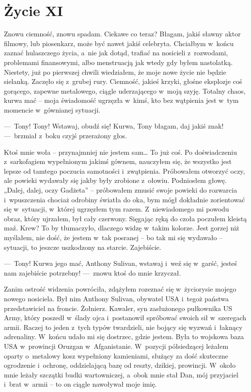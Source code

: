 \chapter{Życie XI}

Znowu ciemność, znowu spadam. Ciekawe co teraz? Błagam, jakiś sławny aktor filmowy, lub piosenkarz, może być nawet jakiś celebryta. Chciałbym w~końcu zaznać hulaszczego życia, a~nie jak dotąd, trafiać na nosicieli z~rozwodami, problemami finansowymi, albo menstruacją jak wtedy gdy byłem nastolatką. Niestety, już po pierwszej chwili wiedziałem, że moje nowe życie nie będzie sielanką. Zaczęło się z~grubej rury. Ciemność, jakieś krzyki, głośne eksplozje coś gorącego,  zapewne metalowego, ciągle uderzającego w~moją szyję. Totalny chaos, kurwa mać -- moja świadomość ugrzęzła w~kimś, kto bez wątpienia jest w~tym momencie w~gównianej sytuacji.  

---~Tony! Tony! Wstawaj, obudź się! Kurwa, Tony błagam, daj jakiś znak! ---~brzmiał z~boku czyjś przerażony głos. 

Ktoś mnie woła -- przynajmniej nie jestem sam… To już coś. Po doświadczeniu z~sarkofagiem wypełnionym jakimś gównem, nauczyłem się, że wszystko jest lepsze od tamtego poczucia samotności i~zwątpienia. Próbowałem otworzyć oczy, ale powieki wydawały się jakby były zrobione z~ołowiu. Podniosłem głowę. „Dalej, dalej, oczy Gadżeta” -- próbowałem zmusić swoje powieki do rozwarcia i~wpuszczenia chociaż odrobiny światła do oka, bym mógł dokładnie zorientować się w~sytuacji, w~której ugrzęzłem tym razem. Z~niewiadomego mi powodu obraz, który ujrzałem, był cały czerwony. Sięgając ręką do czoła poczułem kleistą maź. Krew? To by tłumaczyło, dlaczego widzę w~takim kolorze. Jest gorzej niż myślałem, nie dość, że jestem w~tak posranej -- bo tak mi się wydawało -- sytuacji, to jeszcze uszkodzony na starcie. Zajebiście. 

---~Tony! Kurwa jego mać, Anthony Sulivan, wstawaj i~weź się w~garść, jesteś nam zajebiście potrzebny! ---~znowu ktoś do mnie krzyczał.

Zanim ostrość widzenia powróciła, zdążyłem rozeznać się w~życiorysie mojego nowego nosiciela. Był nim Anthony Sulivan, obywatel USA i~tegoż państwa przedstawiciel na froncie. Żołnierz. Kawaler, syn zasłużonego pułkownika US Army, który poszedł w~ślady ojca i~postanowił spróbować swoich sił w~szeregach armii. Raczej to jeden z~tych typów twardzieli, nie bojący się wyzwań i~łaknący adrenaliny. W~końcu udało mi się dostrzec, gdzie jestem. Była to wojskowa baza USA w~prowincji Oruzgan w~Afganistanie. W~pozycji półsiedzącej leżałem oparty o~metalowy kosz wypełniony kamieniami, służący za dość skuteczne ogrodzenie i~ochronę, oddzielającą bazę od reszty, dzikiej, prowincji. W~około mnie leżały szczątki budki wartowniczej, a~obok mnie stał Dan, mój przyjaciel i~brat w~armii -- to on ciągle nawoływał moje imię.


